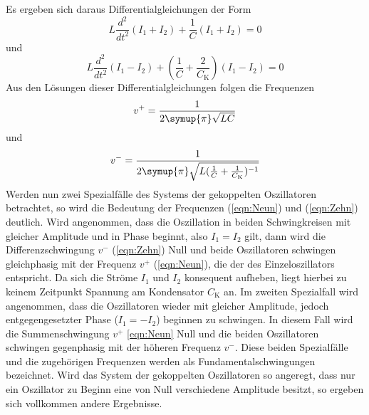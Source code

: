 Es ergeben sich daraus Differentialgleichungen der Form
\begin{equation}
    L \frac{d^2}{dt^2}(I_1 + I_2) + \frac{1}{C}(I_1 +I_2) = 0
    \label{eqn:Sieben}
\end{equation}
und
\begin{equation}
    L \frac{d^2}{dt^2}(I_1 - I_2) + ( \frac{1}{C} + \frac{2}{C_{\text{K}}} ) (I_1 - I_2) = 0
    \label{eqn:Acht}
\end{equation}
Aus den Lösungen dieser Differentialgleichungen folgen die Frequenzen
\begin{equation}
    v^{+} = \frac{1}{ 2\symup{\pi} \sqrt{L C}}
    \label{eqn:Neun}
\end{equation}
und
\begin{equation}
    v^{-} = \frac{1}{ 2\symup{\pi} \sqrt{L (\frac{1}{C} + \frac{1}{C_{\text{K}}})^{-1}}}
    \label{eqn:Zehn}
\end{equation}
\newline
Werden nun zwei Spezialfälle des Systems der gekoppelten Oszillatoren betrachtet, so wird die Bedeutung der Frequenzen (\ref {eqn:Neun}) und (\ref {eqn:Zehn}) deutlich.
\newline
Wird angenommen, dass die Oszillation in beiden Schwingkreisen mit gleicher Amplitude und in Phase beginnt, also $ I_1 = I_2 $ gilt, dann wird die Differenzschwingung $ v^{-} $ (\ref {eqn:Zehn})
Null und beide Oszillatoren schwingen gleichphasig mit der Frequenz $ v^{+} $ (\ref {eqn:Neun}), die der des Einzeloszillators entspricht. Da sich die Ströme $ I_1 $ und $ I_2 $ konsequent
aufheben, liegt hierbei zu keinem Zeitpunkt Spannung am Kondensator $ C_{\text{K}} $ an.
\newline
Im zweiten Spezialfall wird angenommen, dass die Oszillatoren wieder mit gleicher Amplitude, jedoch entgegengesetzter Phase ($ I_1 = -I_2 $) beginnen zu schwingen. In diesem Fall
wird die Summenschwingung $ v^{+} $ \ref {eqn:Neun} Null und die beiden Oszillatoren schwingen gegenphasig mit der höheren Frequenz $ v^{-} $.
\newline
Diese beiden Spezialfälle und die zugehörigen Frequenzen werden als Fundamentalschwingungen bezeichnet.
\newline
Wird das System der gekoppelten Oszillatoren so angeregt, dass nur ein Oszillator zu Beginn eine von Null verschiedene Amplitude besitzt, so ergeben sich vollkommen andere Ergebnisse.
